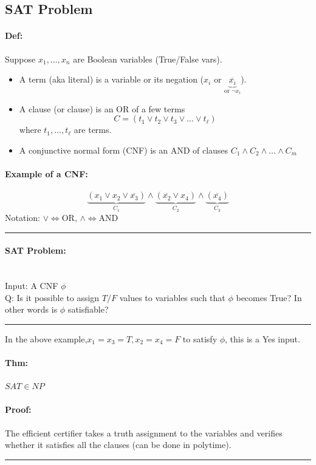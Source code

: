 \documentclass[12 pt]{article}
\begin{document}
          \subsection{SAT Problem}
          \paragraph{Def:} Suppose $x_1, \ldots, x_n$ are Boolean
          variables (True/False vars).
          \begin{itemize}
          \item A term (aka literal) is a variable or its negation
            ($x_i$ or $\underbrace{\overline{x_i}}_{\text{or }\neg
              x_i}$).
          \item A clause (or clause) is an OR of a few terms
            $$C=(t_1 \lor t_2 \lor t_3 \lor \ldots \lor t_{\ell})$$
            where $t_1, \ldots, t_{\ell}$ are terms.
          \item A conjunctive normal form (CNF) is an AND of clauses
            $C_1 \land C_2 \land \ldots \land C_m$
          \end{itemize}
          \paragraph{Example of a CNF:}
          $$\underbrace{(x_1 \lor x_2 \lor \overline{x_3})}_{C_1}
          \land \underbrace{(\overline{x_2} \lor x_4)}_{C_2} \land
          \underbrace{(\overline{x_4})}_{C_3}$$
          Notation: $\lor \iff $OR, $\land \iff $AND
          \\ \noindent \rule{\textwidth}{0.5pt}
          \paragraph{SAT Problem:}~
          \\ Input: A CNF $\phi$
          \\ Q: Is it possible to assign $T/F$ values to variables
          such that $\phi$ becomes True? In other words is $\phi$
          satisfiable?
          \\ \noindent \rule{\textwidth}{0.5pt}
          In the above example,$x_1 = x_3 = T, x_2 = x_4 = F$ to
          satisfy $\phi$, this is a Yes input.
          \paragraph{Thm:} $SAT \in NP$
          \paragraph{Proof:} The efficient certifier takes a truth
          assignment to the variables and verifies whether it
          satisfies all the clauses (can be done in polytime).
          \\ \noindent \rule{\textwidth}{0.5pt}
\end{document}
